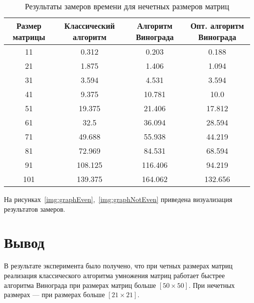 \begin{landscape}
\begin{table}[H]
	\begin{center}
		\begin{threeparttable}
			\captionsetup{justification=raggedright, singlelinecheck=off}
			\caption{Результаты замеров времени для нечетных размеров матриц}
			\label{tbl:time_mes_noteven}
			\begin{tabular}{|c|c|c|c|}
				\hline
				Размер матрицы & Классический алгоритм & Алгоритм Винограда & Опт. алгоритм Винограда\\
				\hline
				11&0.312&0.203&0.188\\
				\hline
				21&1.875&1.406&1.094\\
				\hline
				31&3.594&4.531&3.594\\
				\hline
				41&9.375&10.781&10.0\\
				\hline
				51&19.375&21.406&17.812\\
				\hline
				61&32.5&36.094&28.594\\
				\hline
				71&49.688&55.938&44.219\\
				\hline
				81&72.969&84.531&68.594\\
				\hline
				91&108.125&116.406&94.219\\
				\hline
				101&139.375&164.062&132.656\\
				\hline
			\end{tabular}
		\end{threeparttable}
	\end{center}
\end{table}
\end{landscape}

На рисунках~\ref{img:graphEven},~\ref{img:graphNotEven} приведена визуализация результатов замеров.



\section{Вывод}

В результате эксперимента было получено, что при четных размерах матриц реализация классического алгоритма умножения матриц работает быстрее алгоритма Винограда при размерах матриц больше $[50\times 50]$. При нечетных размерах --- при размерах больше $[21 \times 21]$. 